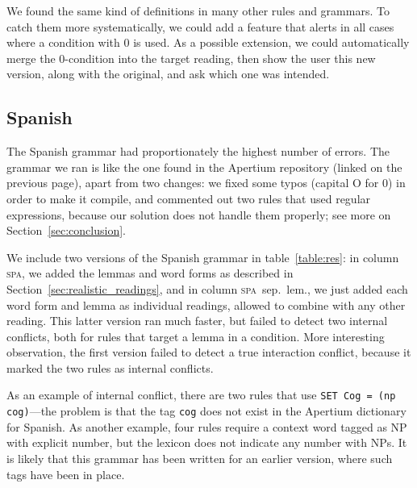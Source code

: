 We found the same kind of definitions in many other rules and grammars.
To catch them more systematically, we could add a feature that alerts in all cases where a condition with 0 is used. As a possible extension, we could automatically merge the 0-condition into the target reading, then show the user this new version, along with the original, and ask which one was intended.


\subsection{Spanish} The Spanish grammar had proportionately the
highest number of errors. The grammar we ran is like the one
found in the Apertium repository (linked on the previous page), 
apart from two changes: we fixed some typos (capital O for 0) in order to make it compile, and
commented out two rules that used regular expressions, because our
solution does not handle them properly; see more on Section~\ref{sec:conclusion}.

We include two versions of the Spanish grammar in table~\ref{table:res}: in column \textsc{spa}, we added the lemmas and word forms as described in Section~\ref{sec:realistic_readings}, and in column \textsc{spa}~{\small sep.~lem.}, we just added each word form and lemma as individual readings, allowed to combine with any other reading. 
This latter version ran much faster, but failed to detect two internal conflicts, both for rules that target a lemma in a condition.
More interesting observation, the first version failed to detect a true interaction conflict, because it marked the two rules as internal conflicts.

As an example of internal conflict, there are two rules that use \texttt{SET Cog = (np cog)}---the problem is that the tag \texttt{cog} does not exist in the Apertium dictionary for Spanish. As another example, four rules require a context word tagged as NP with explicit number, but the lexicon does not indicate any number with NPs. It is likely that this grammar has been written for an earlier version, where such tags have been in place.

